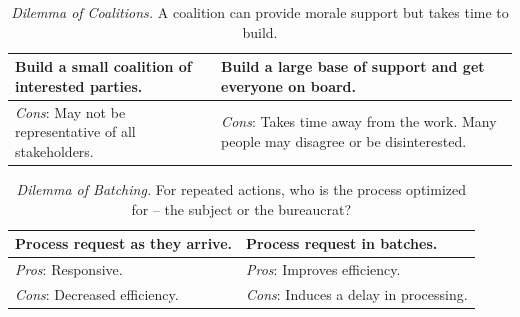 

\begin{center}
\begin{table}[H] %
\begin{tabular}{ | m{\dilemmatablewidth}| m{\dilemmatablewidth} | } 
  \hline
  \textbf{Build a small coalition of interested parties.} & 
  \textbf{Build a large base of support and get everyone on board.} \\ 
  \hline
  \textit{Cons}: May not be representative of all stakeholders. & 
  \textit{Cons}: Takes time away from the work. Many people may disagree or be disinterested. \\  
  \hline
\end{tabular}
\caption{
\textit{Dilemma of Coalitions.}
A coalition can provide morale support but takes time to build.
}
\label{table:how-to-change}
\end{table}
\end{center}



\begin{center}
\begin{table}[H] %
\begin{tabular}{ | m{\dilemmatablewidth}| m{\dilemmatablewidth} | } 
  \hline
  \textbf{Process request as they arrive.} &
  \textbf{Process request in batches.} \\
  \hline
  \textit{Pros}: Responsive. & 
  \textit{Pros}: Improves efficiency. \\
  \hline
  \textit{Cons}: Decreased efficiency. & 
  \textit{Cons}: Induces a delay in processing. \\
  \hline
\end{tabular}
\caption{
\textit{Dilemma of Batching.}
For repeated actions, who is the process optimized for -- the subject or the bureaucrat?
}
\label{table:dilemma-of-batching}
\end{table}
\end{center}

